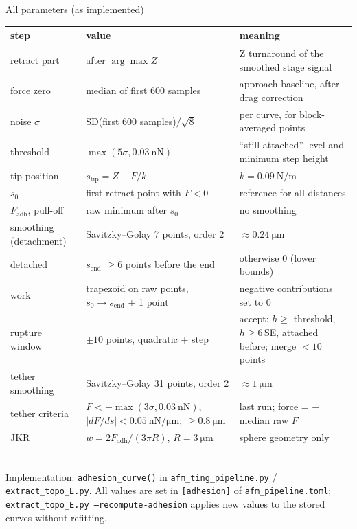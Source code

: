 \documentclass[aspectratio=169,9pt]{beamer}
\begin{document}
\begin{frame}{All parameters (as implemented)}
\scriptsize
\begin{tabularx}{\textwidth}{@{}l l X@{}}
\toprule
step & value & meaning\\
\midrule
retract part & after $\arg\max Z$ & Z turnaround of the smoothed stage signal\\
force zero & median of first 600 samples & approach baseline, after drag correction\\
noise $\sigma$ & SD(first 600 samples)$/\sqrt8$ & per curve, for block-averaged points\\
threshold & $\max(5\sigma,\SI{0.03}{\nano\newton})$ & ``still attached'' level and minimum step height\\
tip position & $s_\text{tip}=Z-F/k$ & $k=\SI{0.09}{\newton\per\metre}$\\
$s_0$ & first retract point with $F<0$ & reference for all distances\\
$F_\text{adh}$, pull-off & raw minimum after $s_0$ & no smoothing\\
smoothing (detachment) & Savitzky--Golay 7 points, order 2 & $\approx\SI{0.24}{\micro\metre}$\\
detached & $s_\text{end}$ $\ge 6$ points before the end & otherwise 0 (lower bounds)\\
work & trapezoid on raw points, $s_0\to s_\text{end}$ + 1 point & negative contributions set to 0\\
rupture window & $\pm10$ points, quadratic + step & accept: $h\ge$ threshold, $h\ge6\,$SE, attached before; merge $<10$ points\\
tether smoothing & Savitzky--Golay 31 points, order 2 & $\approx\SI{1}{\micro\metre}$\\
tether criteria & $F<-\max(3\sigma,\SI{0.03}{\nano\newton})$, $|dF/ds|<\SI{0.05}{\nano\newton\per\micro\metre}$, $\ge\SI{0.8}{\micro\metre}$ & last run; force = $-$median raw $F$\\
JKR & $w=2F_\text{adh}/(3\pi R)$, $R=\SI{3}{\micro\metre}$ & sphere geometry only\\
\bottomrule
\end{tabularx}\\[4pt]
Implementation: \texttt{adhesion\_curve()} in \texttt{afm\_ting\_pipeline.py} / \texttt{extract\_topo\_E.py}. All values are set in \texttt{[adhesion]} of \texttt{afm\_pipeline.toml}; \texttt{extract\_topo\_E.py --recompute-adhesion} applies new values to the stored curves without refitting.
\end{frame}
\end{document}
